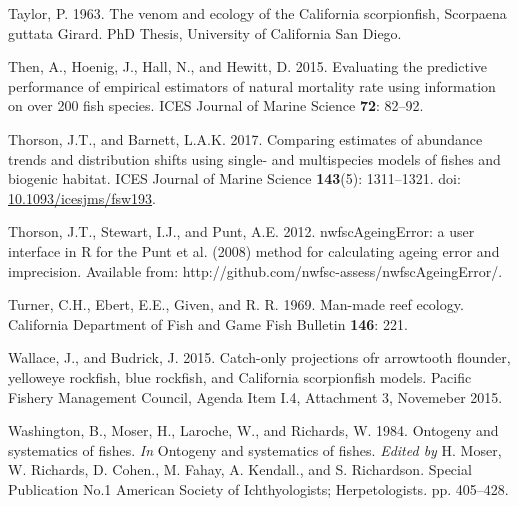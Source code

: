 \documentclass[12pt,]{article}
\begin{document}
\hypertarget{ref-Taylor1963}{}
Taylor, P. 1963. The venom and ecology of the California scorpionfish,
Scorpaena guttata Girard. PhD Thesis, University of California San
Diego.

\hypertarget{ref-Then2015}{}
Then, A., Hoenig, J., Hall, N., and Hewitt, D. 2015. Evaluating the
predictive performance of empirical estimators of natural mortality rate
using information on over 200 fish species. ICES Journal of Marine
Science \textbf{72}: 82--92.

\hypertarget{ref-Thorson2017}{}
Thorson, J.T., and Barnett, L.A.K. 2017. Comparing estimates of
abundance trends and distribution shifts using single- and multispecies
models of fishes and biogenic habitat. ICES Journal of Marine Science
\textbf{143}(5): 1311--1321. doi:
\href{https://doi.org/10.1093/icesjms/fsw193}{10.1093/icesjms/fsw193}.

\hypertarget{ref-Thorson2012}{}
Thorson, J.T., Stewart, I.J., and Punt, A.E. 2012. nwfscAgeingError: a
user interface in R for the Punt et al. (2008) method for calculating
ageing error and imprecision. Available from:
http://github.com/nwfsc-assess/nwfscAgeingError/.

\hypertarget{ref-Turner1969}{}
Turner, C.H., Ebert, E.E., Given, and R. R. 1969. Man-made reef ecology.
California Department of Fish and Game Fish Bulletin \textbf{146}: 221.

\hypertarget{ref-Wallace2015}{}
Wallace, J., and Budrick, J. 2015. Catch-only projections ofr arrowtooth
flounder, yelloweye rockfish, blue rockfish, and California scorpionfish
models. Pacific Fishery Management Council, Agenda Item I.4, Attachment
3, Novemeber 2015.

\hypertarget{ref-Washington1984}{}
Washington, B., Moser, H., Laroche, W., and Richards, W. 1984. Ontogeny
and systematics of fishes. \emph{In} Ontogeny and systematics of fishes.
\emph{Edited by} H. Moser, W. Richards, D. Cohen., M. Fahay, A.
Kendall., and S. Richardson. Special Publication No.1 American Society
of Ichthyologists; Herpetologists. pp. 405--428.
\end{document}

